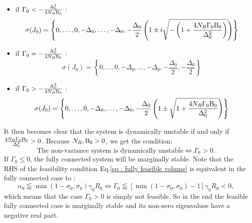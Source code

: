 \documentclass[12pt, titlepage]{report}
\begin{document}
	\begin{itemize}
	\item if $\Gamma_0 < -\frac{\Delta_0^2}{4 N_R \text{B}_0}$ :
	\begin{equation}
	\sigma(J_0)= \left\{0, \dots, 0, -\Delta_0, \dots, -\Delta_0, -\frac{\Delta_0}{2} \left(1\pm i \sqrt{-\left(1+\frac{4N_R\Gamma_0\text{B}_0}{\Delta_0^2}\right)}\right)\right\}
	\end{equation}
	\item if $\Gamma_0 = -\frac{\Delta_0^2}{4 N_R \text{B}_0}$ :
	\begin{equation}
	\sigma(J_0)= \left\{0, \dots, 0, -\Delta_0, \dots, -\Delta_0, -\frac{\Delta_0}{2}, -\frac{\Delta_0}{2}\right\}
	\end{equation}
	\item if $\Gamma_0 > -\frac{\Delta_0^2}{4 N_R \text{B}_0}$ :
	\begin{equation}
	\sigma(J_0)= \left\{0, \dots, 0, -\Delta_0, \dots, -\Delta_0, -\frac{\Delta_0}{2} \left(1\pm \sqrt{1+\frac{4N_R\Gamma_0\text{B}_0}{\Delta_0^2}}\right)\right\} \label{eq : spectrum fully connected possibly negative}
	\end{equation}
	\end{itemize}
	It then becomes clear that the system is dynamically unstable if and only if $\frac{4N_R\Gamma_0 \text{B}_0}{\Delta_0^2} > 0 $. Because $N_R, \text{B}_0 > 0$, we get the condition:
	\begin{equation}
	\boxed{
	\text{The non-variance system is dynamically unstable} \iff \Gamma_0 > 0.
	}
	\end{equation}
	If $\Gamma_0 \leq 0$, the fully connected system will be marginally stable.
	Note that the RHS of the feasibility condition Eq.\eqref{eq : fully feasible volume} is equivalent in the fully connected case to :
	\begin{equation}
	\alpha_0 \lessapprox \min(1-\sigma_0, \sigma_0)\gamma_0 R_0 \iff \Gamma_0 \lessapprox \left[\min(1-\sigma_0, \sigma_0)-1\right] \gamma_0 R_0 < 0,
	\end{equation}
	which means that the case $\Gamma_0 > 0$ is simply not feasible. So in the end the feasible fully connected case is marginally stable and its non-zero eigenvalues have a negative real part.
\end{document}

